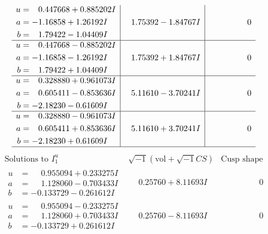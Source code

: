 \documentclass[1p]{elsarticle_modified}
\theoremstyle{definition}
\newcommand{\I}{\sqrt{-1}}
\begin{document}
$$\begin{array}{c|c|c}
\begin{aligned}
u &= \phantom{-}0.447668 + 0.885202 I \\
a &= -1.16858 + 1.26192 I \\
b &= \phantom{-}1.79422 - 1.04409 I\end{aligned}
 & \phantom{-}1.75392 - 1.84767 I & \phantom{-0.000000 } 0 \\ \hline\begin{aligned}
u &= \phantom{-}0.447668 - 0.885202 I \\
a &= -1.16858 - 1.26192 I \\
b &= \phantom{-}1.79422 + 1.04409 I\end{aligned}
 & \phantom{-}1.75392 + 1.84767 I & \phantom{-0.000000 } 0 \\ \hline\begin{aligned}
u &= \phantom{-}0.328880 + 0.961073 I \\
a &= \phantom{-}0.605411 - 0.853636 I \\
b &= -2.18230 - 0.61609 I\end{aligned}
 & \phantom{-}5.11610 - 3.70241 I & \phantom{-0.000000 } 0 \\ \hline\begin{aligned}
u &= \phantom{-}0.328880 - 0.961073 I \\
a &= \phantom{-}0.605411 + 0.853636 I \\
b &= -2.18230 + 0.61609 I\end{aligned}
 & \phantom{-}5.11610 + 3.70241 I & \phantom{-0.000000 } 0\\
 \hline 
 \end{array}$$\newpage$$\begin{array}{c|c|c}  
\text{Solutions to }I^u_{1}& \I (\text{vol} + \sqrt{-1}CS) & \text{Cusp shape}\\
 \hline 
\begin{aligned}
u &= \phantom{-}0.955094 + 0.233275 I \\
a &= \phantom{-}1.128060 - 0.703433 I \\
b &= -0.133729 - 0.261612 I\end{aligned}
 & \phantom{-}0.25760 + 8.11693 I & \phantom{-0.000000 } 0 \\ \hline\begin{aligned}
u &= \phantom{-}0.955094 - 0.233275 I \\
a &= \phantom{-}1.128060 + 0.703433 I \\
b &= -0.133729 + 0.261612 I\end{aligned}
 & \phantom{-}0.25760 - 8.11693 I & \phantom{-0.000000 } 0 \\ \hline\begin{aligned}

\end{aligned}
\end{array}$$
\end{document}
